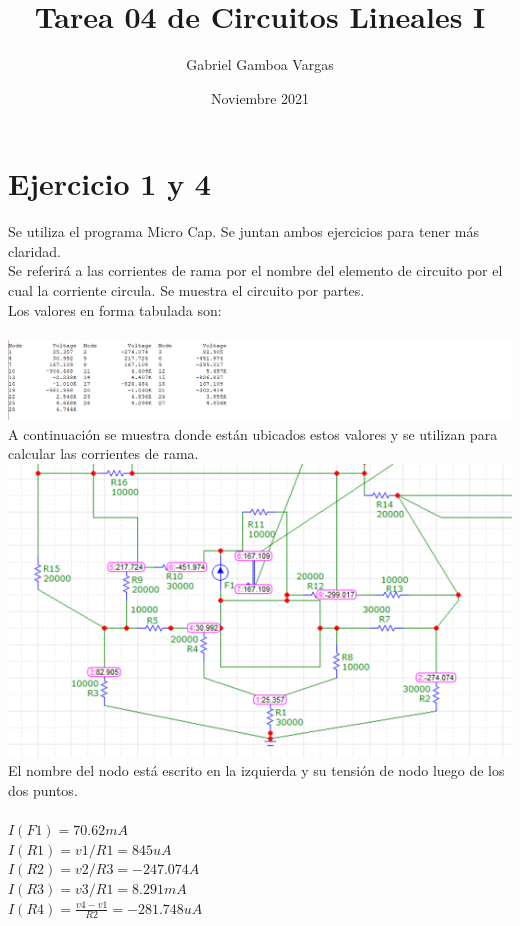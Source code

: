 \documentclass{article}
\title{Tarea 04 de Circuitos Lineales I}
\author{Gabriel Gamboa Vargas}
\date{Noviembre 2021}
\begin{document}
\maketitle
\section{Ejercicio 1 y 4}
Se utiliza el programa Micro Cap. Se juntan ambos ejercicios para tener más claridad.\\
Se referirá a las corrientes de rama por el nombre del elemento de circuito por el cual la corriente circula. Se muestra el circuito por partes.\\
 Los valores en forma tabulada son:\\ \\    
\includegraphics[]{images/tensionesMicroCap.PNG}\\ 
A continuación se muestra donde están ubicados estos valores y se utilizan para calcular las corrientes de rama.\\
\includegraphics[]{images/MicroCap1_75.PNG}\\ 
El nombre del nodo está escrito en la izquierda y su tensión de nodo luego de los dos puntos.\\ \\
$I(F1) =  70.62m A$\\
$I(R1) = v1/R1 = 845u A$\\
$I(R2) = v2/R3 = -247.074 A$\\
$I(R3) = v3/R1 = 8.291m A$\\
$I(R4) = \frac{v4-v1}{R2} = -281.748u A$\\
\end{document}
